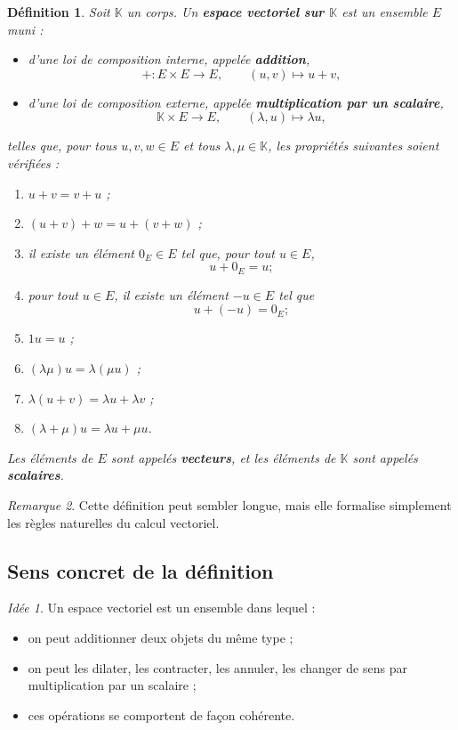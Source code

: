 \documentclass[11pt,a4paper]{article}
\newtheorem{definition}{Définition}[section]
\theoremstyle{remark}
\newtheorem{remarque}[definition]{Remarque}
\newtheorem*{idee}{Idée}
\newcommand{\K}{\mathbb{K}}
\begin{document}
\begin{definition}
Soit \(\K\) un corps.  
Un \textbf{espace vectoriel sur \(\K\)} est un ensemble \(E\) muni :
\begin{itemize}
    \item d’une loi de composition interne, appelée \textbf{addition},
    \[
    + : E\times E \to E,\qquad (u,v)\mapsto u+v,
    \]
    \item d’une loi de composition externe, appelée \textbf{multiplication par un scalaire},
    \[
    \K\times E \to E,\qquad (\lambda,u)\mapsto \lambda u,
    \]
\end{itemize}
telles que, pour tous \(u,v,w\in E\) et tous \(\lambda,\mu\in\K\), les propriétés suivantes soient vérifiées :
\begin{enumerate}[label=\textbf{(EV\arabic*)}]
    \item \(u+v=v+u\) ;
    \item \((u+v)+w=u+(v+w)\) ;
    \item il existe un élément \(0_E\in E\) tel que, pour tout \(u\in E\),
    \[
    u+0_E=u ;
    \]
    \item pour tout \(u\in E\), il existe un élément \(-u\in E\) tel que
    \[
    u+(-u)=0_E ;
    \]
    \item \(1u=u\) ;
    \item \((\lambda\mu)u=\lambda(\mu u)\) ;
    \item \(\lambda(u+v)=\lambda u+\lambda v\) ;
    \item \((\lambda+\mu)u=\lambda u+\mu u\).
\end{enumerate}
Les éléments de \(E\) sont appelés \textbf{vecteurs}, et les éléments de \(\K\) sont appelés \textbf{scalaires}.
\end{definition}

\begin{remarque}
Cette définition peut sembler longue, mais elle formalise simplement les règles naturelles du calcul vectoriel.
\end{remarque}

\subsection{Sens concret de la définition}

\begin{idee}
Un espace vectoriel est un ensemble dans lequel :
\begin{itemize}
    \item on peut additionner deux objets du même type ;
    \item on peut les dilater, les contracter, les annuler, les changer de sens par multiplication par un scalaire ;
    \item ces opérations se comportent de façon cohérente.
\end{itemize}
\end{idee}
\end{document}
